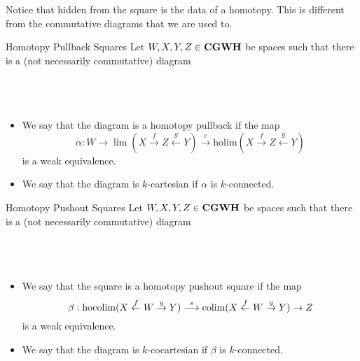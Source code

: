 \documentclass[a4paper]{article}
\begin{document}
Notice that hidden from the square is the data of a homotopy. This is different from the commutative diagrams that we are used to. 

\begin{defn}{Homotopy Pullback Squares}{} Let $W,X,Y,Z\in\bold{CGWH}$ be spaces such that there is a (not necessarily commutative) diagram \\~\\
\\~\\
\begin{itemize}
\item We say that the diagram is a homotopy pullback if the map $$\alpha:W\to\lim(X\overset{f}{\rightarrow}Z\overset{g}{\leftarrow}Y)\overset{c}{\longrightarrow}\text{holim}(X\overset{f}{\rightarrow}Z\overset{g}{\leftarrow}Y)$$ is a weak equivalence. 
\item We say that the diagram is $k$-cartesian if $\alpha$ is $k$-connected. 
\end{itemize}
\end{defn}

\begin{defn}{Homotopy Pushout Squares}{} Let $W,X,Y,Z\in\bold{CGWH}$ be spaces such that there is a (not necessarily commutative) diagram \\~\\
\\~\\
\begin{itemize}
\item We say that the square is a homotopy pushout square if the map $$\beta:\operatorname*{hocolim}(X\overset{f}{\leftarrow}W\overset{g}{\rightarrow}Y)\overset{s}{\longrightarrow}\operatorname*{colim}(X\overset{f}{\leftarrow}W\overset{g}{\rightarrow}Y)\to Z$$ is a weak equivalence. 
\item We say that the diagram is $k$-cocartesian if $\beta$ is $k$-connected. 
\end{itemize}
\end{defn}
\end{document}
